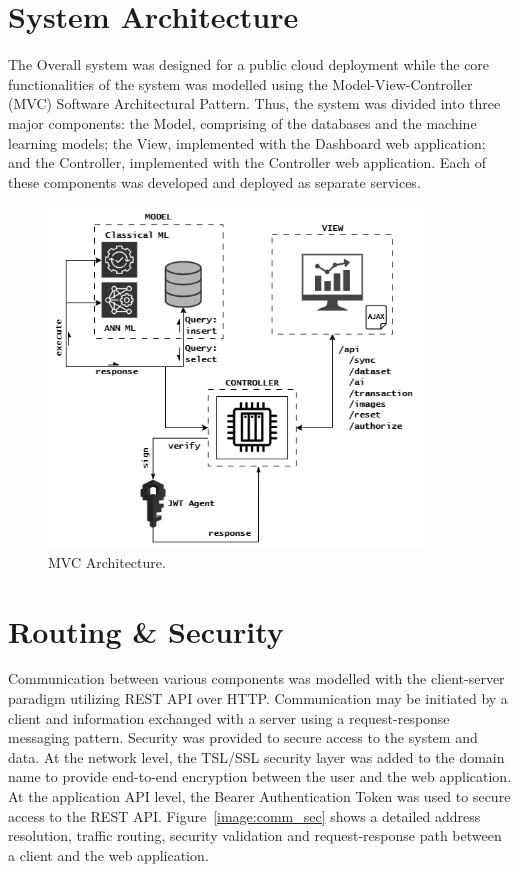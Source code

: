 \section{System Architecture}

The Overall system was designed for a public cloud deployment while the core functionalities of the system was modelled using the
Model-View-Controller (MVC) Software Architectural Pattern. Thus, the system was divided into three major components: the Model, comprising 
of the databases and the machine learning models; the View, implemented with the Dashboard web application; and the Controller, implemented with 
the Controller web application. Each of these components was developed and deployed as separate services. 

\begin{figure}[h!]
    \includegraphics[width=0.9\textwidth]{images/mvc_arch.png}
    \caption{MVC Architecture.}
    \label{image:mvc_arch}
\end{figure}

\section{Routing \& Security}
Communication between various components was modelled with the client-server paradigm utilizing REST API over HTTP. Communication may be initiated
by a client and information exchanged with a server using a request-response messaging pattern.  
Security was provided to secure access to the system and data. At the network level, the TSL/SSL security layer was added to the domain name to 
provide end-to-end encryption between the user and the web application. At the application API level, the Bearer Authentication Token was used to 
secure access to the REST API. Figure~\ref{image:comm_sec} shows a detailed address resolution, traffic routing, security validation and 
request-response path between a client and the web application. 

